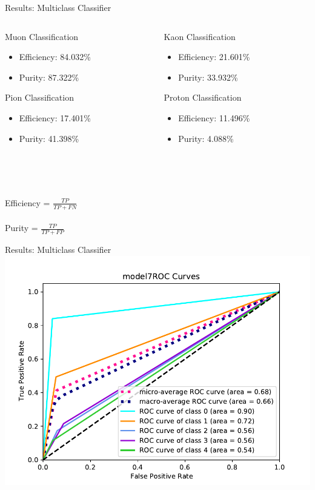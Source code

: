 \documentclass[10pt,handout]{beamer}
\begin{document}
\begin{frame}{Results: Multiclass Classifier}
\begin{columns}
\begin{column}{0.5\textwidth}
Muon Classification
\begin{itemize}
\item Efficiency: 84.032\%
\item Purity: 87.322\%
\end{itemize}
Pion Classification
\begin{itemize}
\item Efficiency: 17.401\%
\item Purity: 41.398\%
\end{itemize}
\end{column}
\begin{column}{0.5\textwidth}
Kaon Classification
\begin{itemize}
\item Efficiency: 21.601\%
\item Purity: 33.932\%
\end{itemize}
Proton Classification
\begin{itemize}
\item Efficiency: 11.496\%
\item Purity: 4.088\%
\end{itemize}
\end{column}
\end{columns}
\centering
\quad  \\
\quad  \\
\quad \quad \\
Efficiency = $\frac{TP}{TP+FN}$ \\
\quad \\
Purity = $\frac{TP}{TP+FP}$
\end{frame}




\begin{frame}{Results: Multiclass Classifier}
\centering
\includegraphics[scale=0.6]{model7_ROCcurves.pdf}
\end{frame}
\end{document}
